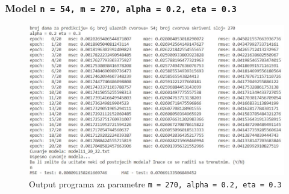 \documentclass[a4paper]{article}
\begin{document}
\pagebreak %
\subsubsection{Model \texttt{n = 54, m = 270, alpha = 0.2, eta = 0.3}}
\begin{figure}[h!]
\begin{center}
\includegraphics[scale=0.9]{output/output_example_program_11_20_22.JPG}
\end{center}
\caption{Output programa za parametre \texttt{m = 270, alpha = 0.2, eta = 0.3}}
\end{figure}
\end{document}
